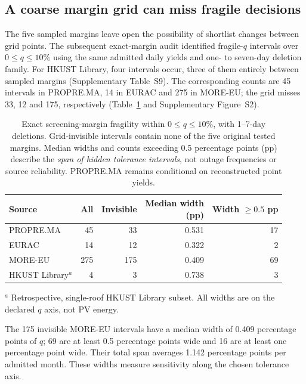 \documentclass[preprint,12pt]{elsarticle}
\begin{document}
\subsection{A coarse margin grid can miss fragile decisions}
The five sampled margins leave open the possibility of shortlist changes between grid points. The subsequent exact-margin audit identified fragile-$q$ intervals over $0\leq q\leq10\%$ using the same admitted daily yields and one- to seven-day deletion family. For HKUST Library, four intervals occur, three of them entirely between sampled margins (Supplementary Table~S9). The corresponding counts are 45 intervals in PROPRE.MA, 14 in EURAC and 275 in MORE-EU; the grid misses 33, 12 and 175, respectively (Table~\ref{tab:exactq} and Supplementary Figure~S2).

\begin{table}[H]
\centering
\caption{Exact screening-margin fragility within $0\leq q\leq10\%$, with 1--7-day deletions. Grid-invisible intervals contain none of the five original tested margins. Median widths and counts exceeding 0.5 percentage points (pp) describe the \emph{span of hidden tolerance intervals}, not outage frequencies or source reliability. PROPRE.MA remains conditional on reconstructed point yields.}
\label{tab:exactq}
\footnotesize
\setlength{\tabcolsep}{5pt}
\begin{tabular}{lrrrr}
\toprule
Source & All & Invisible & \shortstack{Median width\\(pp)} & \shortstack{Width $\geq0.5$\\pp} \\
\midrule
PROPRE.MA & 45 & 33 & 0.531 & 17 \\
EURAC & 14 & 12 & 0.322 & 2 \\
MORE-EU & 275 & 175 & 0.409 & 69 \\
HKUST Library$^{a}$ & 4 & 3 & 0.738 & 3 \\
\bottomrule
\end{tabular}
\begin{flushleft}\footnotesize $^{a}$ Retrospective, single-roof HKUST Library subset. All widths are on the declared $q$ axis, not PV energy.\end{flushleft}
\end{table}

The 175 invisible MORE-EU intervals have a median width of 0.409 percentage points of $q$; 69 are at least 0.5 percentage points wide and 16 are at least one percentage point wide. Their total span averages 1.142 percentage points per admitted month. These widths measure sensitivity along the chosen tolerance axis.
\end{document}
